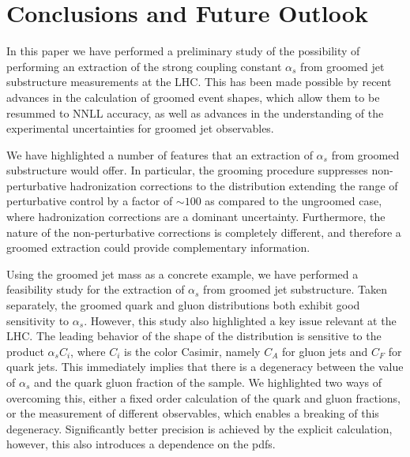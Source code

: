 \documentclass[11pt,letterpaper]{article}
\newcommand{\info}[1]{\textbf{\textcolor{mildred}{(#1)}}}
\begin{document}
%


%


%

\clearpage

\section{Conclusions and Future Outlook}
\label{sec:future}

In this paper we have performed a preliminary study of the possibility of performing an extraction of the strong coupling constant $\alpha_s$ from groomed jet substructure measurements at the LHC.  This has been made possible by recent advances in the calculation of groomed event shapes, which allow them to be resummed to NNLL accuracy, as well as advances in the understanding of the experimental uncertainties for groomed jet observables. 

We have highlighted a number of features that an extraction of $\alpha_s$ from groomed substructure would offer. In particular, the grooming procedure suppresses non-perturbative hadronization corrections to the distribution extending the range of perturbative control by a factor of $\sim 100$ as compared to the ungroomed case, where hadronization corrections are a dominant uncertainty. Furthermore, the nature of the non-perturbative corrections is completely different, and therefore a groomed extraction could provide complementary information. 

Using the groomed jet mass as a concrete example, we have performed a feasibility study for the extraction of $\alpha_s$ from groomed jet substructure. Taken separately, the groomed quark and gluon distributions both exhibit good sensitivity to $\alpha_s$. However, this study also highlighted a key issue relevant at the LHC. The leading behavior of the shape of the distribution is sensitive to the product $\alpha_s C_i$, where $C_i$ is the color Casimir, namely $C_A$ for gluon jets and $C_F$ for quark jets. This immediately implies that there is a degeneracy between the value of $\alpha_s$ and the quark gluon fraction of the sample. We highlighted two ways of overcoming this, either a fixed order calculation of the quark and gluon fractions, or the measurement of different observables, which enables a breaking of this degeneracy. Significantly better precision is achieved by the explicit calculation, however, this also introduces a dependence on the pdfs.
\end{document}
